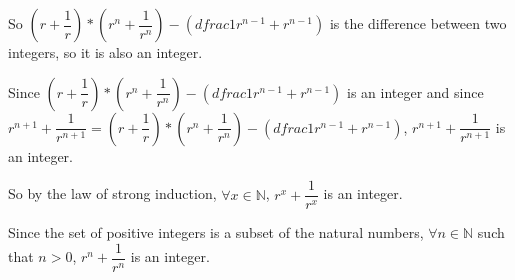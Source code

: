 \documentclass[letterpaper, 11pt]{article}
\begin{document}
So $(r + \dfrac{1}{r}) * (r^n + \dfrac{1}{r^n}) - (dfrac{1}{r^{n-1}} + r^{n-1})$ is the difference between two integers, so it is also an integer.

Since $(r + \dfrac{1}{r}) * (r^n + \dfrac{1}{r^n}) - (dfrac{1}{r^{n-1}} + r^{n-1})$ is an integer and since $r^{n+1} + \dfrac{1}{r^{n+1}} = (r + \dfrac{1}{r}) * (r^n + \dfrac{1}{r^n}) - (dfrac{1}{r^{n-1}} + r^{n-1})$, $r^{n+1} + \dfrac{1}{r^{n+1}}$ is an integer.

So by the law of strong induction, $\forall x \in \mathbb{N}$, $r^x + \dfrac{1}{r^x}$ is an integer.

Since the set of positive integers is a subset of the natural numbers, $\forall n \in \mathbb{N}$ such that $n > 0$, $r^n + \dfrac{1}{r^n}$ is an integer.
\end{document}
